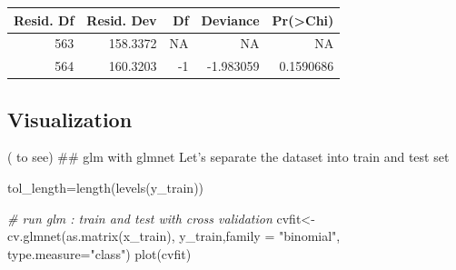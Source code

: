 \documentclass[
  11pt,
]{article}
\newenvironment{Shaded}{\begin{snugshade}}{\end{snugshade}}
\newcommand{\AttributeTok}[1]{\textcolor[rgb]{0.77,0.63,0.00}{#1}}
\newcommand{\CommentTok}[1]{\textcolor[rgb]{0.56,0.35,0.01}{\textit{#1}}}
\newcommand{\DecValTok}[1]{\textcolor[rgb]{0.00,0.00,0.81}{#1}}
\newcommand{\DocumentationTok}[1]{\textcolor[rgb]{0.56,0.35,0.01}{\textbf{\textit{#1}}}}
\newcommand{\FloatTok}[1]{\textcolor[rgb]{0.00,0.00,0.81}{#1}}
\newcommand{\FunctionTok}[1]{\textcolor[rgb]{0.00,0.00,0.00}{#1}}
\newcommand{\NormalTok}[1]{#1}
\newcommand{\OtherTok}[1]{\textcolor[rgb]{0.56,0.35,0.01}{#1}}
\newcommand{\SpecialCharTok}[1]{\textcolor[rgb]{0.00,0.00,0.00}{#1}}
\newcommand{\StringTok}[1]{\textcolor[rgb]{0.31,0.60,0.02}{#1}}
\begin{document}
\begin{tabular}{r|r|r|r|r}
\hline
Resid. Df & Resid. Dev & Df & Deviance & Pr(>Chi)\\
\hline
563 & 158.3372 & NA & NA & NA\\
\hline
564 & 160.3203 & -1 & -1.983059 & 0.1590686\\
\hline
\end{tabular}

\hypertarget{visualization}{%
\subsection{Visualization}\label{visualization}}

( to see) \#\# glm with glmnet Let's separate the dataset into train and
test set

\begin{Shaded}
\end{Shaded}

\begin{Shaded}
\begin{Highlighting}[]
\NormalTok{tol\_length}\OtherTok{=}\FunctionTok{length}\NormalTok{(}\FunctionTok{levels}\NormalTok{(y\_train))}

\CommentTok{\# run glm : train and test with cross validation}
\NormalTok{cvfit}\OtherTok{\textless{}{-}}\FunctionTok{cv.glmnet}\NormalTok{(}\FunctionTok{as.matrix}\NormalTok{(x\_train), y\_train,}\AttributeTok{family =} \StringTok{"binomial"}\NormalTok{, }\AttributeTok{type.measure=}\StringTok{"class"}\NormalTok{)}
\FunctionTok{plot}\NormalTok{(cvfit)}
\end{Highlighting}
\end{Shaded}
\end{document}
